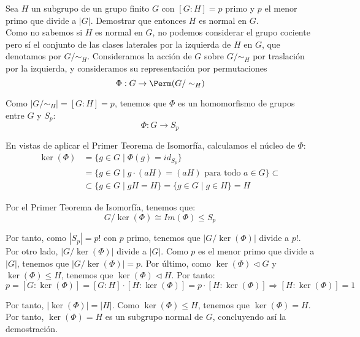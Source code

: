 \begin{ejercicio}\label{ej:6.16}
    Sea $H$ un subgrupo de un grupo finito $G$ con $[G : H] = p$ primo y $p$ el menor primo que divide a $|G|$. Demostrar que entonces $H$ es normal en $G$.\\

    Como no sabemos si $H$ es normal en $G$, no podemos considerar el grupo cociente pero sí el conjunto de las clases laterales por la izquierda de $H$ en $G$, que denotamos por $G/\sim_H$. Consideramos la acción de $G$ sobre $G/\sim_H$ por traslación por la izquierda, y consideramos su representación por permutaciones
    \begin{equation*}
        \Phi: G \to \Perm(G/\sim_H)
    \end{equation*}

    Como $|G/\sim_H| = [G:H] = p$, tenemos que $\Phi$ es un homomorfismo de grupos entre $G$ y $S_p$:
    \begin{equation*}
        \Phi: G \to S_p
    \end{equation*}

    En vistas de aplicar el Primer Teorema de Isomorfía, calculamos el núcleo de $\Phi$:
    \begin{align*}
        \ker(\Phi) &= \{g\in G\mid \Phi(g) = id_{S_p}\}\\
        &= \{g\in G\mid g\cdot (aH) = (aH)\text{ para todo }a\in G\} \subset\\
        &\subset \{g\in G\mid gH = H\} = \{g\in G\mid g\in H\} = H
    \end{align*}

    Por el Primer Teorema de Isomorfía, tenemos que:
    \begin{equation*}
        G/\ker(\Phi) \cong Im(\Phi) \leq S_p
    \end{equation*}

    Por tanto, como $|S_p| = p!$ con $p$ primo, tenemos que $|G/\ker(\Phi)|$ divide a $p!$.
    Por otro lado, $|G/\ker(\Phi)|$ divide a $|G|$. Como $p$ es el menor primo que divide a $|G|$, tenemos que $|G/\ker(\Phi)|=p$.
    Por último, como $\ker(\Phi)\lhd G$ y $\ker(\Phi)\leq H$, tenemos que $\ker(\Phi)\lhd H$. Por tanto:
    \begin{equation*}
        p = [G:\ker(\Phi)] = [G:H]\cdot [H:\ker(\Phi)] = p\cdot [H:\ker(\Phi)]
        \Longrightarrow [H:\ker(\Phi)]=1
    \end{equation*}

    Por tanto, $|\ker(\Phi)|=|H|$. Como $\ker(\Phi)\leq H$, tenemos que $\ker(\Phi)=H$. Por tanto, $\ker(\Phi)=H$ es un subgrupo normal de $G$, concluyendo así la demostración.
\end{ejercicio}

